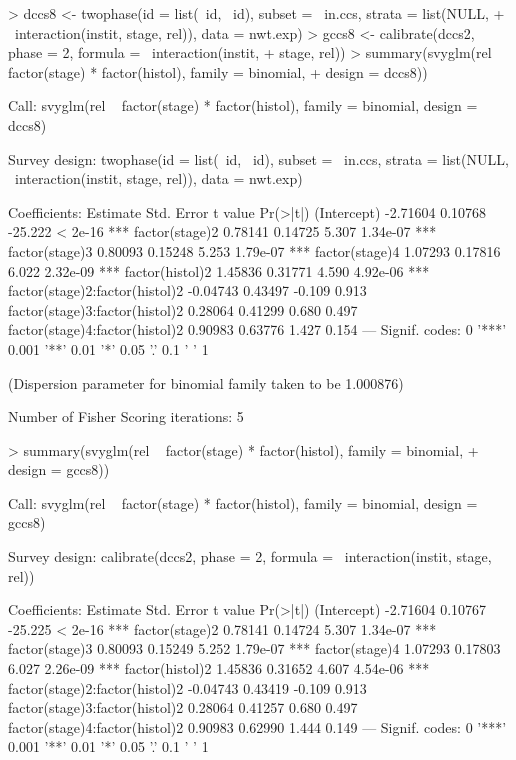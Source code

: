 \documentclass{article}
\begin{document}
\begin{Schunk}
\begin{Sinput}
> dccs8 <- twophase(id = list(~id, ~id), subset = ~in.ccs, strata = list(NULL, 
+     ~interaction(instit, stage, rel)), data = nwt.exp)
> gccs8 <- calibrate(dccs2, phase = 2, formula = ~interaction(instit, 
+     stage, rel))
> summary(svyglm(rel ~ factor(stage) * factor(histol), family = binomial, 
+     design = dccs8))
\end{Sinput}
\begin{Soutput}
Call:
svyglm(rel ~ factor(stage) * factor(histol), family = binomial, 
    design = dccs8)

Survey design:
twophase(id = list(~id, ~id), subset = ~in.ccs, strata = list(NULL, 
    ~interaction(instit, stage, rel)), data = nwt.exp)

Coefficients:
                               Estimate Std. Error t value Pr(>|t|)    
(Intercept)                    -2.71604    0.10768 -25.222  < 2e-16 ***
factor(stage)2                  0.78141    0.14725   5.307 1.34e-07 ***
factor(stage)3                  0.80093    0.15248   5.253 1.79e-07 ***
factor(stage)4                  1.07293    0.17816   6.022 2.32e-09 ***
factor(histol)2                 1.45836    0.31771   4.590 4.92e-06 ***
factor(stage)2:factor(histol)2 -0.04743    0.43497  -0.109    0.913    
factor(stage)3:factor(histol)2  0.28064    0.41299   0.680    0.497    
factor(stage)4:factor(histol)2  0.90983    0.63776   1.427    0.154    
---
Signif. codes:  0 '***' 0.001 '**' 0.01 '*' 0.05 '.' 0.1 ' ' 1 

(Dispersion parameter for binomial family taken to be 1.000876)

Number of Fisher Scoring iterations: 5
\end{Soutput}
\begin{Sinput}
> summary(svyglm(rel ~ factor(stage) * factor(histol), family = binomial, 
+     design = gccs8))
\end{Sinput}
\begin{Soutput}
Call:
svyglm(rel ~ factor(stage) * factor(histol), family = binomial, 
    design = gccs8)

Survey design:
calibrate(dccs2, phase = 2, formula = ~interaction(instit, stage, 
    rel))

Coefficients:
                               Estimate Std. Error t value Pr(>|t|)    
(Intercept)                    -2.71604    0.10767 -25.225  < 2e-16 ***
factor(stage)2                  0.78141    0.14724   5.307 1.34e-07 ***
factor(stage)3                  0.80093    0.15249   5.252 1.79e-07 ***
factor(stage)4                  1.07293    0.17803   6.027 2.26e-09 ***
factor(histol)2                 1.45836    0.31652   4.607 4.54e-06 ***
factor(stage)2:factor(histol)2 -0.04743    0.43419  -0.109    0.913    
factor(stage)3:factor(histol)2  0.28064    0.41257   0.680    0.497    
factor(stage)4:factor(histol)2  0.90983    0.62990   1.444    0.149    
---
Signif. codes:  0 '***' 0.001 '**' 0.01 '*' 0.05 '.' 0.1 ' ' 1 


\end{Soutput}
\end{Schunk}
\end{document}
